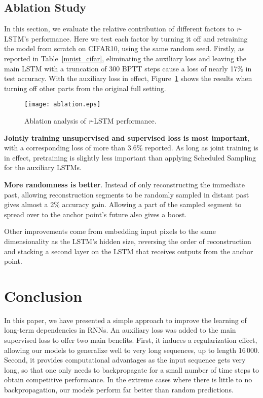 \documentclass{article}
\newcommand{\rlstm}{{\it r}-LSTM}
\begin{document}
\subsection{Ablation Study}

In this section, we evaluate the relative contribution of different factors to \rlstm{}'s performance. Here we test each factor by turning it off and retraining the model from scratch on CIFAR10, using the same random seed. Firstly, as reported in Table~\ref{mnist_cifar}, eliminating the auxiliary loss and leaving the main LSTM with a truncation of 300 BPTT steps cause a loss of nearly 17\% in test accuracy. With the auxiliary loss in effect, Figure~\ref{fig:ablation} shows the results when turning off other parts from the original full setting.

\begin{figure}[htb]
\texttt{[image: ablation.eps]}
\caption{Ablation analysis of \rlstm{} performance.}
\label{fig:ablation}
\end{figure}


\textbf{Jointly training unsupervised and supervised loss is most important}, with a corresponding loss of more than 3.6\% reported. As long as joint training is in effect, pretraining is slightly less important than applying Scheduled Sampling for the auxiliary LSTMs.

\textbf{More randomness is better}. Instead of only reconstructing the immediate past, allowing reconstruction segments to be randomly sampled in distant past gives almost a 2\% accuracy gain. Allowing a part of the sampled segment to spread over to the anchor point's future also gives a boost.

Other improvements come from embedding input pixels to the same dimensionality as the LSTM's hidden size, reversing the order of reconstruction and stacking a second layer on the LSTM that receives outputs from the anchor point.

\section{Conclusion}
In this paper, we have presented a simple approach to improve the learning of long-term dependencies in RNNs. An auxiliary loss was added to the main supervised loss to offer two main benefits. 
First, it induces a regularization effect, allowing our models to generalize well to very long sequences, up to length 16\,000.
Second, it provides computational advantages as the input sequence gets very long, so that
one only needs to backpropagate for a small number of time steps to obtain competitive performance. In the extreme cases where there is little to no backpropagation, our models perform far better than random predictions.
\end{document}
